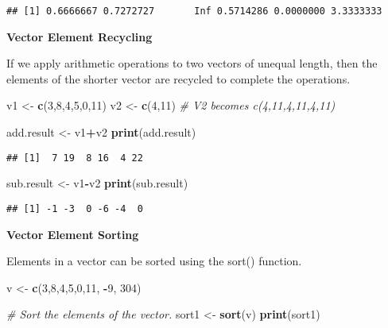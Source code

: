 \documentclass[
]{article}
\newenvironment{Shaded}{\begin{snugshade}}{\end{snugshade}}
\newcommand{\CommentTok}[1]{\textcolor[rgb]{0.56,0.35,0.01}{\textit{#1}}}
\newcommand{\DecValTok}[1]{\textcolor[rgb]{0.00,0.00,0.81}{#1}}
\newcommand{\FunctionTok}[1]{\textcolor[rgb]{0.13,0.29,0.53}{\textbf{#1}}}
\newcommand{\NormalTok}[1]{#1}
\newcommand{\OtherTok}[1]{\textcolor[rgb]{0.56,0.35,0.01}{#1}}
\newcommand{\SpecialCharTok}[1]{\textcolor[rgb]{0.81,0.36,0.00}{\textbf{#1}}}
\begin{document}
\begin{verbatim}
## [1] 0.6666667 0.7272727       Inf 0.5714286 0.0000000 3.3333333
\end{verbatim}

\textbf{Vector Element Recycling}

If we apply arithmetic operations to two vectors of unequal length, then
the elements of the shorter vector are recycled to complete the
operations.

\begin{Shaded}
\begin{Highlighting}[]
\NormalTok{v1 }\OtherTok{\textless{}{-}} \FunctionTok{c}\NormalTok{(}\DecValTok{3}\NormalTok{,}\DecValTok{8}\NormalTok{,}\DecValTok{4}\NormalTok{,}\DecValTok{5}\NormalTok{,}\DecValTok{0}\NormalTok{,}\DecValTok{11}\NormalTok{)}
\NormalTok{v2 }\OtherTok{\textless{}{-}} \FunctionTok{c}\NormalTok{(}\DecValTok{4}\NormalTok{,}\DecValTok{11}\NormalTok{)}
\CommentTok{\# V2 becomes c(4,11,4,11,4,11)}

\NormalTok{add.result }\OtherTok{\textless{}{-}}\NormalTok{ v1}\SpecialCharTok{+}\NormalTok{v2}
\FunctionTok{print}\NormalTok{(add.result)}
\end{Highlighting}
\end{Shaded}

\begin{verbatim}
## [1]  7 19  8 16  4 22
\end{verbatim}

\begin{Shaded}
\begin{Highlighting}[]
\NormalTok{sub.result }\OtherTok{\textless{}{-}}\NormalTok{ v1}\SpecialCharTok{{-}}\NormalTok{v2}
\FunctionTok{print}\NormalTok{(sub.result)}
\end{Highlighting}
\end{Shaded}

\begin{verbatim}
## [1] -1 -3  0 -6 -4  0
\end{verbatim}

\textbf{Vector Element Sorting}

Elements in a vector can be sorted using the sort() function.

\begin{Shaded}
\begin{Highlighting}[]
\NormalTok{v }\OtherTok{\textless{}{-}} \FunctionTok{c}\NormalTok{(}\DecValTok{3}\NormalTok{,}\DecValTok{8}\NormalTok{,}\DecValTok{4}\NormalTok{,}\DecValTok{5}\NormalTok{,}\DecValTok{0}\NormalTok{,}\DecValTok{11}\NormalTok{, }\SpecialCharTok{{-}}\DecValTok{9}\NormalTok{, }\DecValTok{304}\NormalTok{)}

\CommentTok{\# Sort the elements of the vector.}
\NormalTok{sort1 }\OtherTok{\textless{}{-}} \FunctionTok{sort}\NormalTok{(v)}
\FunctionTok{print}\NormalTok{(sort1)}
\end{Highlighting}
\end{Shaded}
\end{document}
